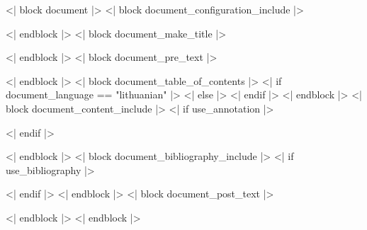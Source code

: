\documentclass[<< document_class_args >>]{<< document_class >>}
\begin{document}
<| block document |>
<| block document_configuration_include |>
  
<| endblock |>
<| block document_make_title |>
  \maketitle
<| endblock |>
<| block document_pre_text |>
  
<| endblock |>
<| block document_table_of_contents |>
  <| if document_language == "lithuanian" |>
  <| else |>
  <| endif |>
  {
    \singlespacing
    \tableofcontents
  }
<| endblock |>
<| block document_content_include |>
  \pagestyle{plain}
  <| if use_annotation |>
  
  <| endif |>
  
<| endblock |>
<| block document_bibliography_include |>
  <| if use_bibliography |>
  \nocite{*}

  \Bibliography
  <| endif |>
<| endblock |>
<| block document_post_text |>
  
<| endblock |>
<| endblock |>
\end{document}
